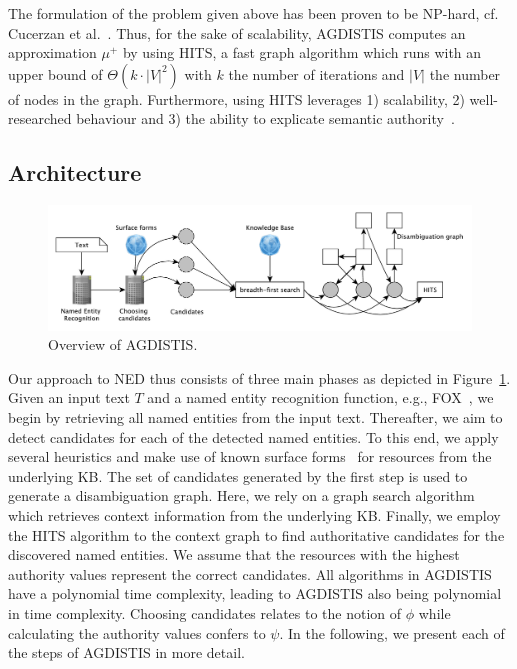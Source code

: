 The formulation of the problem given above has been proven to be NP-hard, cf. Cucerzan et al.~\cite{Cucerzan07}.
Thus, for the sake of scalability, AGDISTIS computes an approximation $\mu^{+}$ by using  \ac{HITS}, a fast graph algorithm which runs with an upper bound of $\Theta(k\cdot |V|^2)$ with $k$ the number of iterations and $|V|$ the number of nodes in the graph.
Furthermore, using \ac{HITS} leverages 1) scalability, 2) well-researched behaviour and 3) the ability to explicate semantic authority~\cite{HITS}. 

\subsection{Architecture}
\begin{figure}[h!tb]
\centering
\includegraphics[width=\linewidth]{part_02/unstructured_annotation/fig/overview.pdf}
\caption{Overview of AGDISTIS.}
\label{fig:overview_agdistis}
\end{figure}

Our approach to \ac{NED} thus consists of three main phases as depicted in Figure~\ref{fig:overview_agdistis}.
Given an input text $T$ and a named entity recognition function, e.g., FOX~\cite{FOX}, we begin by retrieving all named entities from the input text.
Thereafter, we aim to detect candidates for each of the detected named entities.
To this end, we apply several heuristics and make use of known surface forms~\cite{spotlight} for resources from the underlying \ac{KB}.
The set of candidates generated by the first step is used to generate a disambiguation graph. 
Here, we rely on a graph search algorithm which retrieves context information from the underlying \ac{KB}. 
Finally, we employ the  \ac{HITS} algorithm to the context graph to find authoritative candidates for the discovered named entities.
We assume that the resources with the highest authority values represent the correct candidates.
All algorithms in AGDISTIS have a polynomial time complexity, leading to AGDISTIS also being polynomial in time complexity.
Choosing candidates relates to the notion of $\phi$ while calculating the authority values confers to $\psi$.
In the following, we present each of the steps of AGDISTIS in more detail.

